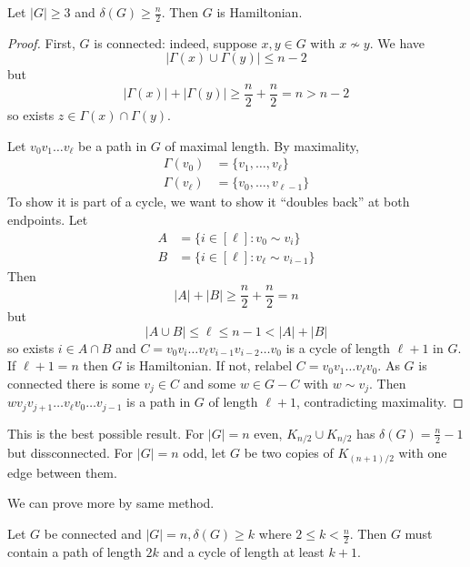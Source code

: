 \documentclass[a4paper]{article}
\begin{document}
\begin{theorem}[Dirac]
  Let \(|G| \geq 3\) and \(\delta(G) \geq \frac{n}{2}\). Then \(G\) is Hamiltonian.
\end{theorem}

\begin{proof}
  First, \(G\) is connected: indeed, suppose \(x, y \in G\) with \(x \nsim y\). We have
  \[
    |\Gamma(x) \cup \Gamma(y)| \leq n - 2
  \]
  but
  \[
    |\Gamma(x)| + |\Gamma(y)| \geq \frac{n}{2} + \frac{n}{2} = n > n - 2
  \]
  so exists \(z \in \Gamma(x) \cap \Gamma(y)\).

  Let \(v_0 v_1 \dots v_\ell\) be a path in \(G\) of maximal length. By maximality,
  \begin{align*}
    \Gamma(v_0) &= \{v_1, \dots, v_\ell\} \\
    \Gamma(v_\ell) &= \{v_0, \dots, v_{\ell - 1}\}
  \end{align*}
  To show it is part of a cycle, we want to show it ``doubles back'' at both endpoints. Let
  \begin{align*}
    A &= \{i \in [\ell]: v_0 \sim v_i\} \\
    B &= \{i \in [\ell]: v_\ell \sim v_{i - 1}\}
  \end{align*}
  Then
  \[
    |A| + |B| \geq \frac{n}{2} + \frac{n}{2} = n
  \]
  but
  \[
    |A \cup B| \leq \ell \leq n - 1 < |A| + |B|
  \]
  so exists \(i \in A \cap B\) and \(C = v_0v_i \dots v_\ell v_{i - 1} v_{i - 2} \dots v_0\) is a cycle of length \(\ell + 1\) in \(G\). If \(\ell + 1 = n\) then \(G\) is Hamiltonian. If not, relabel \(C = v_0 v_1 \dots v_\ell v_0\). As \(G\) is connected there is some \(v_j \in C\) and some \(w \in G - C\) with \(w \sim v_j\). Then \(w v_j v_{j + 1} \dots v_\ell v_0 \dots v_{j - 1}\) is a path in \(G\) of length \(\ell + 1\), contradicting maximality.
\end{proof}

This is the best possible result. For \(|G| = n\) even, \(K_{n/2} \cup K_{n/2}\) has \(\delta(G) = \frac{n}{2} - 1\) but dissconnected. For \(|G| = n\) odd, let \(G\) be two copies of \(K_{(n + 1)/2}\) with one edge between them.

We can prove more by same method.

\begin{proposition}
  Let \(G\) be connected and \(|G| = n, \delta(G) \geq k\) where \(2 \leq k < \frac{n}{2}\). Then \(G\) must contain a path of length \(2k\) and a cycle of length at least \(k + 1\).
\end{proposition}
\end{document}
